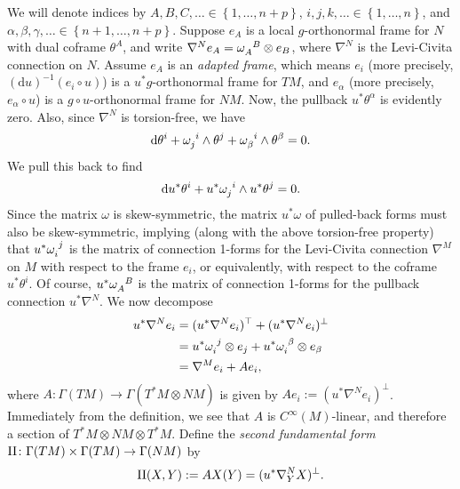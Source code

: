 \documentclass{book}
\renewcommand{\d}{\mathrm{d}}
\newcommand{\set}[1]{\left\{ {#1} \right\}}
\theoremstyle{definition}
\numberwithin{equation}{section}
\begin{document}
We will denote indices by $A,B,C,\dots \in \set{1,\dots,n+p}$, $i,j,k,\dots \in \set{1,\dots,n}$, and $\alpha,\beta,\gamma,\dots \in \set{n+1,\dots,n+p}$. Suppose $e_A$ is a local $g$-orthonormal frame for $N$ with dual coframe $\theta^A$, and write $\nabla^N e_A = \tensor{\omega}{_A^B} \otimes e_B$, where $\nabla^N$ is the Levi-Civita connection on $N$. Assume $e_A$ is an \textit{adapted frame}, which means $e_i$ (more precisely, $(\d{u})^{-1}(e_i \circ u)$) is a $u^*g$-orthonormal frame for $TM$, and $e_\alpha$ (more precisely, $e_\alpha \circ u$) is a $g \circ u$-orthonormal frame for $NM$. Now, the pullback $u^*\theta^\alpha$ is evidently zero. Also, since $\nabla^N$ is torsion-free, we have 
\begin{equation}
    \d\theta^i + \tensor{\omega}{_j^i} \wedge \theta^j + \tensor{\omega}{_\beta^i} \wedge \theta^\beta = 0.
\end{equation}
We pull this back to find
\begin{equation}
    \d{u^*\theta^i} + u^* \tensor{\omega}{_j^i} \wedge u^* \theta^j = 0.
\end{equation}
Since the matrix $\omega$ is skew-symmetric, the matrix $u^* \omega$ of pulled-back forms must also be skew-symmetric, implying (along with the above torsion-free property) that $u^*\tensor{\omega}{_i^j}$ is the matrix of connection 1-forms for the Levi-Civita connection $\nabla^M$ on $M$ with respect to the frame $e_i$, or equivalently, with respect to the coframe $u^*\theta^i$. Of course, $u^* \tensor{\omega}{_A^B}$ is the matrix of connection 1-forms for the pullback connection $u^* \nabla^N$. We now decompose 
\begin{equation} \begin{aligned}
    u^* \nabla^N e_i &= (u^* \nabla^N e_i)^\top + (u^* \nabla^N e_i)^\bot  \\
                     &= \tensor{u^* \omega}{_i^j} \otimes e_j + \tensor{u^* \omega}{_i^\beta} \otimes e_\beta \\
                     &= \nabla^M e_i + A e_i,
\end{aligned} \end{equation}
where $A \colon \Gamma(TM) \to \Gamma(T^*M \otimes NM)$ is given by $Ae_i := (u^* \nabla^N e_i)^\bot$. Immediately from the definition, we see that $A$ is $C^\infty(M)$-linear, and therefore a section of $T^*M \otimes NM \otimes T^*M$. Define the \textit{second fundamental form} ${\rm II} \colon \Gamma(TM) \times \Gamma(TM) \to \Gamma(NM)$ by
\begin{equation}
    {\rm II}(X,Y) := AX(Y) = (u^* \nabla^N_Y X)^\bot.
\end{equation}
\end{document}
